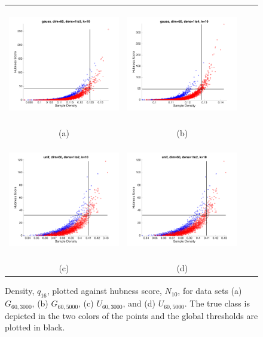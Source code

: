 \documentclass[graybox]{svmult}
\begin{document}
\begin{figure}
\centering
    \begin{tabular}{cccc}
        \includegraphics[width=2.5in,height=2in]{../fig/gauss-dim60-1to2-k10-GlobDensGlobHubs.png} &
        \includegraphics[width=2.5in,height=2in]{../fig/gauss-dim60-1to4-k10-GlobDensGlobHubs.png} \\
        {\scriptsize (a)} &  {\scriptsize (b)} \\
        \includegraphics[width=2.5in,height=2in]{../fig/unif-dim60-1to2-k10-GlobDensGlobHubs.png}&
        \includegraphics[width=2.5in,height=2in]{../fig/unif-dim60-1to2-k10-GlobDensGlobHubs.png}\\
        {\scriptsize (c)} &  {\scriptsize (d)} 
      \end{tabular}
      \caption{Density, $q_{16}$, plotted against hubness score, $N_{10}$, for data sets (a) $G_{60,3000}$, (b) $G_{60,5000}$, (c) $U_{60,3000}$, and (d) $U_{60,5000}$. The true class is depicted in the two colors of the points and the global thresholds are plotted in black.}\label{fig:GlobDensHubs}
\end{figure}
\end{document}
